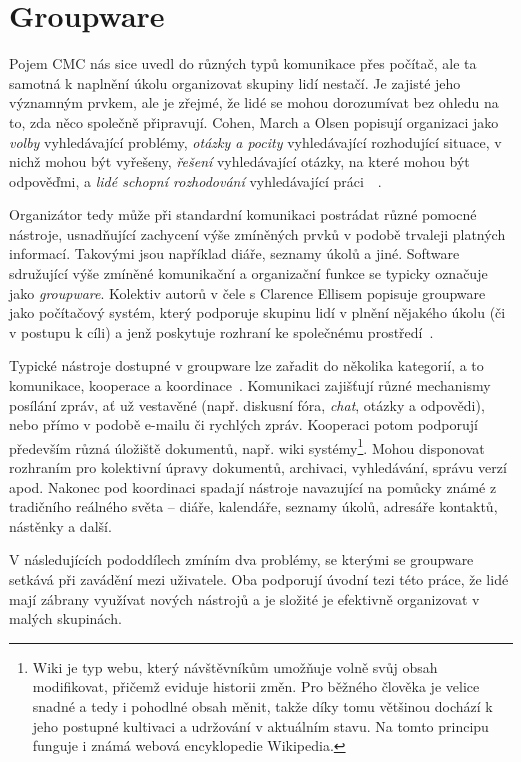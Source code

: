 \documentclass[12pt,oneside,final]{fithesis2}
\begin{document}
\section{Groupware}\label{groupware}
Pojem CMC nás sice uvedl do různých typů komunikace přes počítač, ale ta samotná k naplnění úkolu organizovat skupiny lidí nestačí. Je zajisté jeho významným prvkem, ale je zřejmé, že lidé se mohou dorozumívat bez ohledu na to, zda něco společně připravují. Cohen, March a Olsen popisují organizaci jako \emph{volby} vyhledávající problémy, \emph{otázky a pocity} vyhledávající rozhodující situace, v nichž mohou být vyřešeny, \emph{řešení} vyhledávající otázky, na které mohou být odpověďmi, a \emph{lidé schopní rozhodování} vyhledávající práci~\cite{cohen1972garbage}~\cite{grudin1994groupware}.

Organizátor tedy může při standardní komunikaci postrádat různé pomocné nástroje, usnadňující zachycení výše zmíněných prvků v podobě trvaleji platných informací. Takovými jsou například diáře, seznamy úkolů a jiné. Software sdružující výše zmíněné komunikační a organizační funkce se typicky označuje jako \emph{groupware}. Kolektiv autorů v čele s Clarence Ellisem popisuje groupware jako počítačový systém, který podporuje skupinu lidí v plnění nějakého úkolu (či v postupu k cíli) a jenž poskytuje rozhraní ke společnému prostředí~\cite{ellis1991groupware}.

Typické nástroje dostupné v groupware lze zařadit do několika kategorií, a to komunikace, kooperace a koordinace~\cite{kunstova1999skupinova}. Komunikaci zajišťují různé mechanismy posílání zpráv, ať už vestavěné (např. diskusní fóra, \emph{chat}, otázky a odpovědi), nebo přímo v podobě e-mailu či rychlých zpráv. Kooperaci potom podporují především různá úložiště dokumentů, např. wiki systémy\footnote{Wiki je typ webu, který návštěvníkům umožňuje volně svůj obsah modifikovat, přičemž eviduje historii změn. Pro běžného člověka je velice snadné a tedy i pohodlné obsah měnit, takže díky tomu většinou dochází k jeho postupné kultivaci a udržování v aktuálním stavu. Na tomto principu funguje i známá webová encyklopedie Wikipedia.}. Mohou disponovat rozhraním pro kolektivní úpravy dokumentů, archivaci, vyhledávání, správu verzí apod. Nakonec pod koordinaci spadají nástroje navazující na pomůcky známé z tradičního reálného světa -- diáře, kalendáře, seznamy úkolů, adresáře kontaktů, nástěnky a další.

V následujících pododdílech zmíním dva problémy, se kterými se groupware setkává při zavádění mezi uživatele. Oba podporují úvodní tezi této práce, že lidé mají zábrany využívat nových nástrojů a je složité je efektivně organizovat v malých skupinách.
\end{document}
